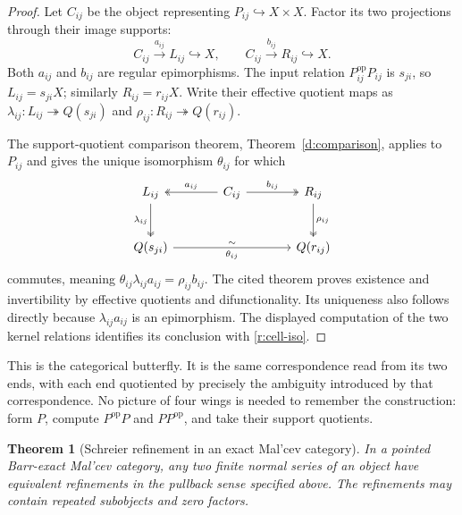 \documentclass[11pt]{article}
\newtheorem{theorem}{Theorem}[section]
\theoremstyle{definition}
\theoremstyle{remark}\newtheorem{remark}[theorem]{Remark}
\begin{document}
\begin{proof}
Let $C_{ij}$ be the object representing $P_{ij}\hookrightarrow X\times X$.
Factor its two projections through their image supports:
\[
 C_{ij}\xrightarrow{a_{ij}}L_{ij}\hookrightarrow X,
 \qquad C_{ij}\xrightarrow{b_{ij}}R_{ij}\hookrightarrow X.
\]
Both $a_{ij}$ and $b_{ij}$ are regular epimorphisms.  The input relation
$P_{ij}^{\mathrm{op}}P_{ij}$ is $s_{ji}$, so $L_{ij}=s_{ji}X$; similarly
$R_{ij}=r_{ij}X$.  Write their effective quotient maps as
$\lambda_{ij}:L_{ij}\twoheadrightarrow Q(s_{ji})$ and
$\rho_{ij}:R_{ij}\twoheadrightarrow Q(r_{ij})$.

The support-quotient comparison theorem, Theorem~\ref{d:comparison},
applies to $P_{ij}$ and gives the unique isomorphism $\theta_{ij}$ for
which
\[
\begin{tikzcd}[column sep=large,row sep=large]
L_{ij}\arrow[d,two heads,"\lambda_{ij}"']
 &C_{ij}\arrow[l,two heads,"a_{ij}"']
          \arrow[r,two heads,"b_{ij}"]
 &R_{ij}\arrow[d,two heads,"\rho_{ij}"]\\
Q(s_{ji})\arrow[rr,"\theta_{ij}"',"\sim"]
 &&Q(r_{ij})
\end{tikzcd}
\]
commutes, meaning
$\theta_{ij}\lambda_{ij}a_{ij}=\rho_{ij}b_{ij}$.
The cited theorem proves existence and invertibility by effective
quotients and difunctionality.  Its uniqueness also follows directly
because $\lambda_{ij}a_{ij}$ is an epimorphism.  The displayed computation
of the two kernel relations identifies its conclusion with
\eqref{r:cell-iso}.
\end{proof}

This is the categorical butterfly.  It is the same correspondence read
from its two ends, with each end quotiented by precisely the ambiguity
introduced by that correspondence.  No picture of four wings is needed
to remember the construction: form $P$, compute $P^{\mathrm{op}}P$ and
$PP^{\mathrm{op}}$, and take their support quotients.

\begin{theorem}[Schreier refinement in an exact Mal'cev category]
\label{r:schreier}
\label{j:schreier}
In a pointed Barr-exact Mal'cev category, any two finite normal series of
an object have equivalent refinements in the pullback sense specified
above.  The refinements may contain repeated subobjects and zero factors.
\end{theorem}
\end{document}
